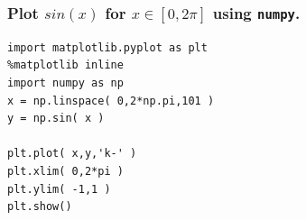 \documentclass[11pt]{beamer}
\begin{document}

\begin{frame}[fragile]
  \frametitle{Plot $sin(x)$ for $x \in \left[ 0, 2\pi \right]$ using \texttt{numpy}.}
  \Enlarge

  

  \begin{Verbatim}
import matplotlib.pyplot as plt
%matplotlib inline  
import numpy as np
x = np.linspace( 0,2*np.pi,101 )
y = np.sin( x )

plt.plot( x,y,'k-' )
plt.xlim( 0,2*pi )
plt.ylim( -1,1 )
plt.show()
  \end{Verbatim}
   
\end{frame}
\end{document}
